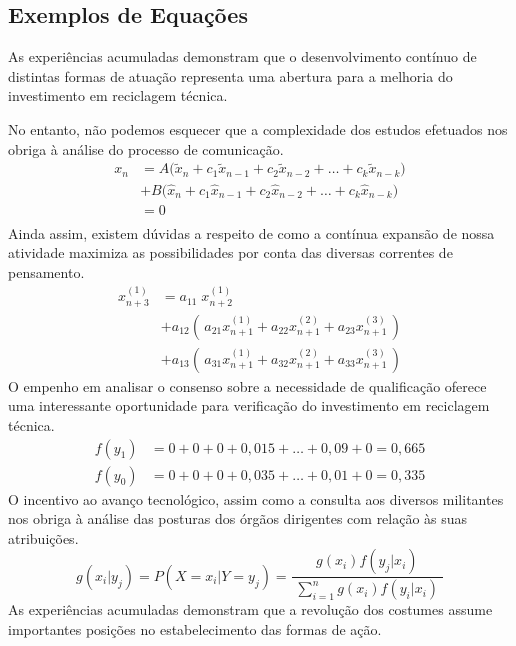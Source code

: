 \begin{apendicesenv}
    \chapter{Exemplos de Equações}
    \label{chap_exemplos_equacoes}

    As experiências acumuladas demonstram que o desenvolvimento contínuo de
    distintas formas de atuação representa uma abertura para a melhoria do
    investimento em reciclagem técnica.

    No entanto, não podemos esquecer que a complexidade dos estudos efetuados nos
    obriga à análise do processo de comunicação.
    \[
        \begin{split}
            x_n & = A \big( \tilde{x}_n + c_1\tilde{x}_{n-1} + c_2\tilde{x}_{n-2} + \dots + c_k\tilde{x}_{n-k} \big) \\
            & + B \big(   \hat{x}_n + c_1  \hat{x}_{n-1} + c_2  \hat{x}_{n-2} + \dots + c_k  \hat{x}_{n-k} \big) \\
            & = 0 \\
        \end{split}
    \]
    Ainda assim, existem dúvidas a respeito de como a contínua expansão de nossa
    atividade maximiza as possibilidades por conta das diversas correntes de
    pensamento.
    \begin{equation}
        \begin{split}
            x_{n+3}^{(1)} & = a_{11}\; x_{n+2}^{(1)}                                                                  \\[2mm]
            & + a_{12} \left( \, a_{21}x_{n+1}^{(1)}+a_{22}x_{n+1}^{(2)}+a_{23}x_{n+1}^{(3)} \, \right) \\[2mm]
            & + a_{13} \left( \, a_{31}x_{n+1}^{(1)}+a_{32}x_{n+1}^{(2)}+a_{33}x_{n+1}^{(3)} \, \right)
        \end{split}
    \end{equation}
    O empenho em analisar o consenso sobre a necessidade de qualificação oferece uma
    interessante oportunidade para verificação do investimento em reciclagem
    técnica.
    \begin{align*}
        f(y_1) & = 0 + 0 + 0 + 0,015 + \dots + 0,09 + 0 = 0,665 \\
        f(y_0) & = 0 + 0 + 0 + 0,035 + \dots + 0,01 + 0 = 0,335
    \end{align*}
    O incentivo ao avanço tecnológico, assim como a consulta aos diversos militantes nos obriga
    à análise das posturas dos órgãos dirigentes com relação às suas atribuições.
    \[
        g(x_i|y_j) = P(X=x_i|Y=y_j) = \frac{g(x_i) f(y_j|x_i)}{\displaystyle\;\sum_{i=1}^{n} g(x_i) f(y_i|x_i)\;}
    \]
    As experiências acumuladas demonstram que a revolução dos costumes
    assume importantes posições no estabelecimento das formas de ação.


\end{apendicesenv}
